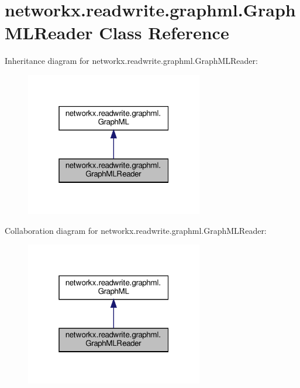 \hypertarget{classnetworkx_1_1readwrite_1_1graphml_1_1GraphMLReader}{}\section{networkx.\+readwrite.\+graphml.\+Graph\+M\+L\+Reader Class Reference}
\label{classnetworkx_1_1readwrite_1_1graphml_1_1GraphMLReader}


Inheritance diagram for networkx.\+readwrite.\+graphml.\+Graph\+M\+L\+Reader\+:
\nopagebreak
\begin{figure}[H]
\begin{center}
\leavevmode
\includegraphics[width=220pt]{classnetworkx_1_1readwrite_1_1graphml_1_1GraphMLReader__inherit__graph}
\end{center}
\end{figure}


Collaboration diagram for networkx.\+readwrite.\+graphml.\+Graph\+M\+L\+Reader\+:
\nopagebreak
\begin{figure}[H]
\begin{center}
\leavevmode
\includegraphics[width=220pt]{classnetworkx_1_1readwrite_1_1graphml_1_1GraphMLReader__coll__graph}
\end{center}
\end{figure}
